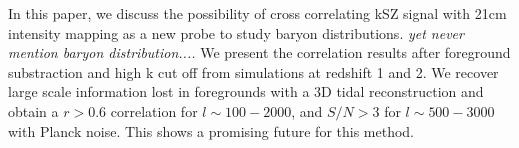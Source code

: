 

In this paper, we discuss the possibility of cross correlating kSZ signal with 
21cm intensity mapping as a new probe to study baryon distributions.
{\it yet never mention baryon distribution....} 
We present the correlation results after foreground substraction and high k cut off from simulations at redshift 1 and 2. 
We recover large scale information lost in foregrounds with a 3D tidal reconstruction and obtain a $r>0.6$ correlation for $l\sim100-2000$, 
and $S/N>3$ for $l\sim 500-3000$ with Planck noise. 
This shows a promising future for this method.
 
